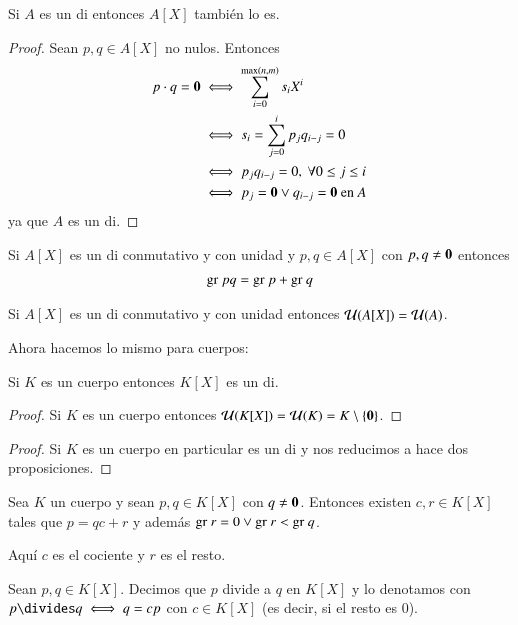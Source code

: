 \begin{pro}
	Si $A$ es un \gls{di} entonces $A[X]$ también lo es.
\end{pro}

\begin{proof}
	Sean $p,q \in A[X]$ no nulos. Entonces
	\begin{align*}
		p\cdot q = \mathbf{0} &\iff \sum_{i=0}^{\max(n,m)} s_iX^i \\
		&\iff s_i = \sum_{j=0}^i p_jq_{i-j} = 0 \\
		&\iff p_jq_{i-j} = 0,\ \forall 0 \leq j \leq i \\
		&\iff p_j = \mathbf{0} \lor q_{i-j} = \mathbf{0} \text{ en } A
	\end{align*}
	ya que $A$ es un \gls{di}.
\end{proof}

\begin{cor}
	Si $A[X]$ es un \gls{di} conmutativo y con unidad y $p,q \in A[X]$ con $p,q \neq \mathbf{0}$ entonces
	\begin{align}
		\text{gr } pq = \text{gr } p + \text{gr } q
	\end{align}
\end{cor}


\begin{pro}
	Si $A[X]$ es un \gls{di} conmutativo y con unidad entonces $\mathcal{U}(A[X]) = \mathcal{U}(A)$.
\end{pro}

Ahora hacemos lo mismo para cuerpos:

\begin{pro}
	Si $K$ es un cuerpo entonces $K[X]$ es un \gls{di}.
\end{pro}

\begin{proof}
	Si $K$ es un cuerpo entonces $\mathcal{U}(K[X]) = \mathcal{U}(K) = K \setminus \{\mathbf{0}\}$.
\end{proof}

\begin{proof}
	Si $K$ es un cuerpo en particular es un \gls{di} y nos reducimos a hace dos proposiciones.
\end{proof}

\begin{thm}
	Sea $K$ un cuerpo y sean $p, q \in K[X]$ con $q \neq \mathbf{0}$. Entonces existen $c,r \in K[X]$ tales que $p = qc+r$ y además $\text{gr } r = 0 \lor \text{gr } r < \text{gr } q$.
\end{thm}

Aquí $c$ es el cociente y $r$ es el resto.

\begin{dfn}[Divisibilidad]
	Sean $p,q \in K[X]$. Decimos que $p$ divide a $q$ en $K[X]$ y lo denotamos con $p \divides q \iff q = cp$ con $c \in K[X]$ (es decir, si el resto es 0).
\end{dfn}

